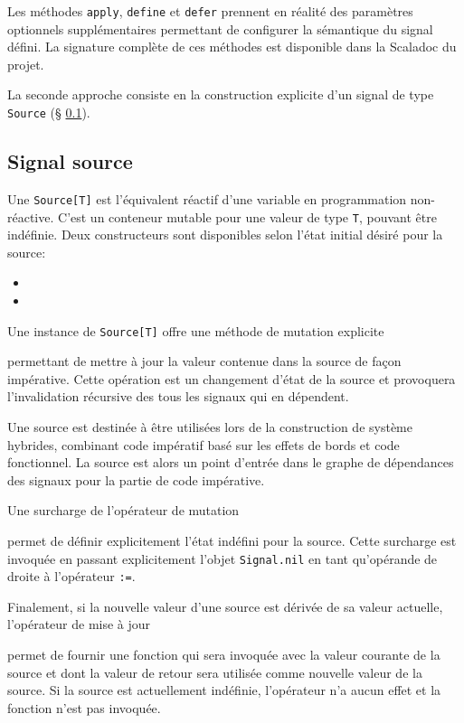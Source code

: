 Les méthodes \texttt{apply}, \texttt{define} et \texttt{defer} prennent en réalité des paramètres optionnels supplémentaires permettant de configurer la sémantique du signal défini. La signature complète de ces méthodes est disponible dans la Scaladoc du projet.

La seconde approche consiste en la construction explicite d'un signal de type \texttt{Source} (§ \ref{sec:sig-source}). 

\subsection{Signal source} \label{sec:sig-source}

Une \texttt{Source[T]} est l'équivalent réactif d'une variable en programmation non-réactive. C'est un conteneur mutable pour une valeur de type \texttt{T}, pouvant être indéfinie. Deux constructeurs sont disponibles selon l'état initial désiré pour la source:

\begin{itemize}
	\item {}
	\item {}
\end{itemize}

Une instance de \texttt{Source[T]} offre une méthode de mutation explicite
\begin{center}
\end{center}
permettant de mettre à jour la valeur contenue dans la source de façon impérative. Cette opération est un changement d'état de la source et provoquera l'invalidation récursive des tous les signaux qui en dépendent.

Une source est destinée à être utilisées lors de la construction de système hybrides, combinant code impératif basé sur les effets de bords et code fonctionnel. La source est alors un point d'entrée dans le graphe de dépendances des signaux pour la partie de code impérative.

Une surcharge de l'opérateur de mutation
\begin{center}
\end{center}
permet de définir explicitement l'état indéfini pour la source. Cette surcharge est invoquée en passant explicitement l'objet \texttt{Signal.nil} en tant qu'opérande de droite à l'opérateur \texttt{:=}.

Finalement, si la nouvelle valeur d'une source est dérivée de sa valeur actuelle, l'opérateur de mise à jour
\begin{center}
\end{center}
permet de fournir une fonction qui sera invoquée avec la valeur courante de la source et dont la valeur de retour sera utilisée comme nouvelle valeur de la source. Si la source est actuellement indéfinie, l'opérateur n'a aucun effet et la fonction n'est pas invoquée.

